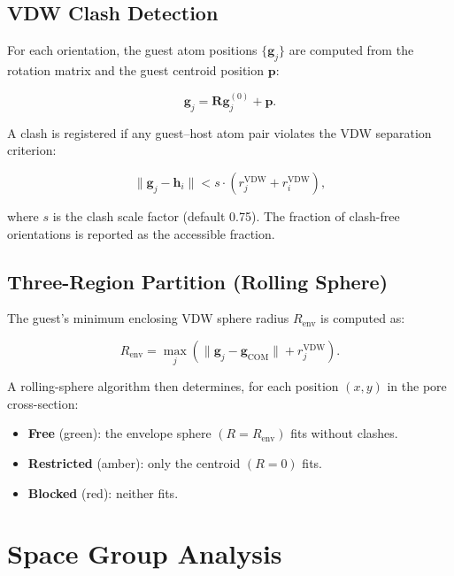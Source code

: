 \documentclass[11pt,a4paper]{article}
\newcommand{\vect}[1]{\bm{#1}}
\begin{document}
\subsection{VDW Clash Detection}

For each orientation, the guest atom positions $\{\vect{g}_j\}$ are
computed from the rotation matrix and the guest centroid position
$\vect{p}$:

\begin{equation}
\vect{g}_j = \vect{R} \vect{g}_j^{(0)} + \vect{p}.
\end{equation}

A clash is registered if any guest--host atom pair violates the VDW
separation criterion:

\begin{equation}
\|\vect{g}_j - \vect{h}_i\| < s \cdot (r_j^{\text{VDW}} + r_i^{\text{VDW}}),
\end{equation}

where $s$ is the clash scale factor (default 0.75).  The fraction of
clash-free orientations is reported as the accessible fraction.

\subsection{Three-Region Partition (Rolling Sphere)}

The guest's minimum enclosing VDW sphere radius $R_{\text{env}}$ is
computed as:

\begin{equation}
R_{\text{env}} = \max_j \left( \|\vect{g}_j - \vect{g}_{\text{COM}}\| +
r_j^{\text{VDW}} \right).
\end{equation}

A rolling-sphere algorithm then determines, for each position
$(x, y)$ in the pore cross-section:

\begin{itemize}
    \item \textbf{Free} (green): the envelope sphere
          $(R = R_{\text{env}})$ fits without clashes.
    \item \textbf{Restricted} (amber): only the centroid
          $(R = 0)$ fits.
    \item \textbf{Blocked} (red): neither fits.
\end{itemize}

\section{Space Group Analysis}
\end{document}
